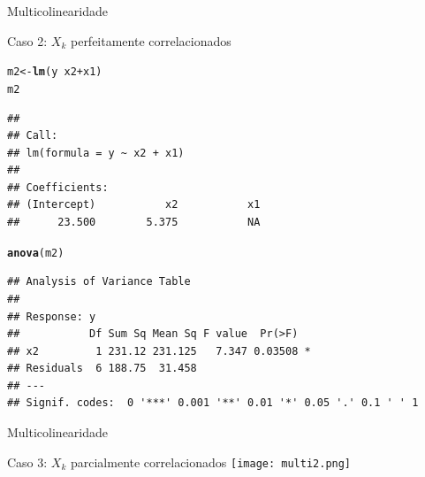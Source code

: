 \documentclass{beamer}\usepackage[]{graphicx}\usepackage[]{color}
\makeatletter
\newcommand{\hlopt}[1]{\textcolor[rgb]{0,0,0}{#1}}%
\newcommand{\hlstd}[1]{\textcolor[rgb]{0.345,0.345,0.345}{#1}}%
\newcommand{\hlkwb}[1]{\textcolor[rgb]{0.69,0.353,0.396}{#1}}%
\newcommand{\hlkwd}[1]{\textcolor[rgb]{0.737,0.353,0.396}{\textbf{#1}}}%
\newenvironment{kframe}{%
 \def\at@end@of@kframe{}%
 \ifinner\ifhmode%
  \def\at@end@of@kframe{\end{minipage}}%
  \begin{minipage}{\columnwidth}%
 \fi\fi%
 \def\FrameCommand##1{\hskip\@totalleftmargin \hskip-\fboxsep
 \colorbox{shadecolor}{##1}\hskip-\fboxsep
     \hskip-\linewidth \hskip-\@totalleftmargin \hskip\columnwidth}%
 \MakeFramed {\advance\hsize-\width
   \@totalleftmargin\z@ \linewidth\hsize
   \@setminipage}}%
 {\par\unskip\endMakeFramed%
 \at@end@of@kframe}
\newenvironment{knitrout}{}{} %
\renewenvironment{knitrout}{\setlength{\topsep}{0mm}}{}
\makeatother
\begin{document}
\begin{frame}[fragile]{Multicolinearidade}

Caso 2: $X_k$ perfeitamente correlacionados
\vfill

\begin{knitrout}\tiny
{}\color{fgcolor}\begin{kframe}
\begin{alltt}
\hlstd{m2} \hlkwb{<-} \hlkwd{lm}\hlstd{(y} \hlopt{~} \hlstd{x2} \hlopt{+} \hlstd{x1)}
\hlstd{m2}
\end{alltt}
\begin{verbatim}
## 
## Call:
## lm(formula = y ~ x2 + x1)
## 
## Coefficients:
## (Intercept)           x2           x1  
##      23.500        5.375           NA
\end{verbatim}
\begin{alltt}
\hlkwd{anova}\hlstd{(m2)}
\end{alltt}
\begin{verbatim}
## Analysis of Variance Table
## 
## Response: y
##           Df Sum Sq Mean Sq F value  Pr(>F)  
## x2         1 231.12 231.125   7.347 0.03508 *
## Residuals  6 188.75  31.458                  
## ---
## Signif. codes:  0 '***' 0.001 '**' 0.01 '*' 0.05 '.' 0.1 ' ' 1
\end{verbatim}
\end{kframe}
\end{knitrout}

\end{frame}


\begin{frame}{Multicolinearidade}

Caso 3: $X_k$ parcialmente correlacionados
\vfill
\texttt{[image: multi2.png]}
 
\end{frame}
\end{document}
